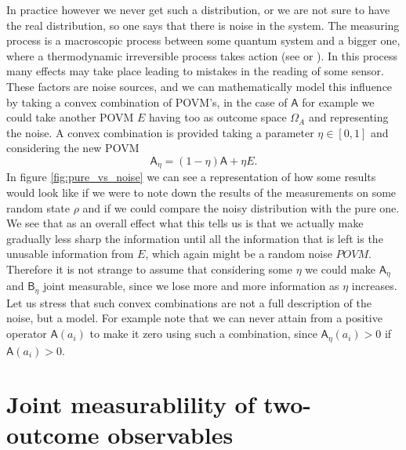 \documentclass[10pt, a4paper]{amsart}
\begin{document}
In practice however we never get such a distribution, or we are not sure to have the real distribution, so one says that there is noise in the system. 
The measuring process is a macroscopic process between some quantum system and a bigger one, where a thermodynamic irreversible process takes action (see \cite{LudwigQuantenmechanik} or \cite{ludwig1953messprozess}). In this process many effects may take place leading to mistakes in the reading of some sensor. These factors are noise sources, and we can mathematically model this influence by taking a convex combination of POVM's, in the case of $\mathsf{A}$ for example we could take another POVM $E$ having too as outcome space $\Omega_{A}$ and representing the noise. A convex combination is provided taking a parameter $\eta\in [0,1]$ and considering the new POVM 
$$
\mathsf{A}_{\eta} = (1-\eta)\mathsf{A} + \eta E.
$$
In figure \ref{fig:pure_vs_noise} we can see a representation of how some results would look like if we were to note down the results of the measurements on some random state $\rho $ and if we could compare the noisy distribution with the pure one. We see that as an overall effect what this tells us is that we actually make gradually less sharp the information until all the information that is left is the unusable information from $E$, which again might be a random noise $POVM$. Therefore it is not strange to assume that considering some $\eta $ we could make $\mathsf{A}_{\eta}$ and $\mathsf{B}_{\eta} $ joint measurable, since we lose more and more information as $\eta $ increases. Let us stress that such convex combinations are not a full description of the noise, but a model. For example note that we can never attain from a positive operator $\mathsf{A}(a_{i})$ to make it zero using such a combination, since $\mathsf{A}_{\eta}(a_{i})> 0$ if $\mathsf{A}(a_{i})> 0. $\\













\newpage
\section{Joint measurablility of two-outcome observables}
\label{section:Compatibility of effects}
\end{document}
